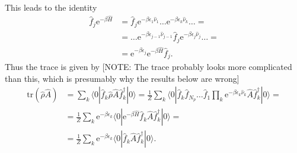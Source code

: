\documentclass[english, parskip=full]{scrartcl}
\renewcommand{\bra}{}
\renewcommand{\braket}{}
\newcommand{\kla}{}
\newcommand{\tecxt}{}
\newcommand{\e}{\text{e}}
\begin{document}
This leads to the identity
\begin{align}
\hat{f}_j \e^{-\beta\hat{H}} &= \hat{f}_j \e^{-\beta\epsilon_1 \hat{\nu}_1} \dots \e^{-\beta\epsilon_k \hat{\nu}_k} \dots = \\
&= \dots \e^{-\beta\epsilon_{j-1} \hat{\nu}_{j-1}} \hat{f}_j \e^{-\beta\epsilon_j \hat{\nu}_j} \dots = \\
&= \e^{-\beta\epsilon_j} \e^{-\beta\hat{H}} \hat{f}_j.
\end{align}
Thus the trace is given by [NOTE: The trace probably looks more complicated than this, which is presumably why the results below are wrong]
\begin{align}
\tecxt\text{tr}\kla\left( \hat{\rho}\hat{A} \right) &= \sum_{k} \braket\langle 0 | \hat{f}_k \hat{\rho} \hat{A} \hat{f}_k^\dagger | 0 \rangle = \frac{1}{Z} \sum_k \braket\langle 0 | \hat{f}_k  \hat{f}_{N_p} \dots \hat{f}_1 \prod_k \e^{-\beta\epsilon_k \hat{\nu}_k} \hat{A} \hat{f}_{k}^\dagger | 0 \rangle = \\
&= \frac{1}{Z} \sum_k \e^{-\beta\epsilon_k} \braket\langle 0 | \e^{-\beta\hat{H}} \hat{f}_k \hat{A} \hat{f}_k^\dagger | 0 \rangle = \\
&= \frac{1}{Z} \sum_k \e^{-\beta\epsilon_k} \braket\langle 0 | \hat{f}_{k} \hat{A} \hat{f}_k^\dagger | 0 \rangle.
\end{align}
\end{document}
